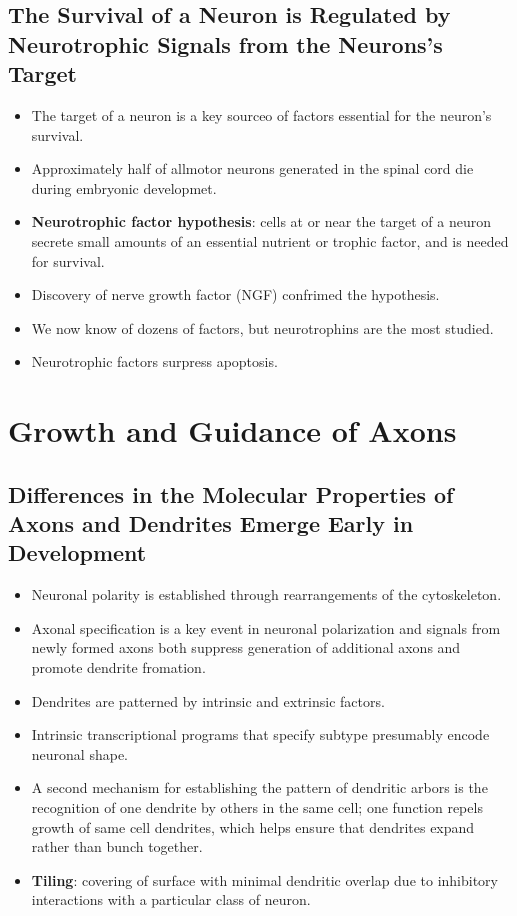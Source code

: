 \documentclass[12pt,a4paper]{article}
\begin{document}
\subsection{The Survival of a Neuron is Regulated by Neurotrophic Signals from the Neurons's Target}
\begin{itemize}
    \item The target of a neuron is a key sourceo of factors essential for the neuron's survival.
    \item Approximately half of allmotor neurons generated in the spinal cord die during embryonic developmet.
    \item \textbf{Neurotrophic factor hypothesis}: cells at or near the target of a neuron secrete small amounts of an essential nutrient or trophic factor, and is needed for survival.
    \item Discovery of nerve growth factor (NGF) confrimed the hypothesis.
    \item We now know of dozens of factors, but neurotrophins are the most studied.
    \item Neurotrophic factors surpress apoptosis.
\end{itemize}

\clearpage
\section{Growth and Guidance of Axons}
\subsection{Differences in the Molecular Properties of Axons and Dendrites Emerge Early in Development}
\begin{itemize}
    \item Neuronal polarity is established through rearrangements of the cytoskeleton.
    \item Axonal specification is a key event in neuronal polarization and signals from newly formed axons both suppress generation of additional axons and promote dendrite fromation.
    \item Dendrites are patterned by intrinsic and extrinsic factors.
    \item Intrinsic transcriptional programs that specify subtype presumably encode neuronal shape.
    \item A second mechanism for establishing the pattern of dendritic arbors is the recognition of one dendrite by others in the same cell; one function repels growth of same cell dendrites, which helps ensure that dendrites expand rather than bunch together. 
    \item \textbf{Tiling}: covering of surface with minimal dendritic overlap due to inhibitory interactions with a particular class of neuron.
\end{itemize}
\end{document}
